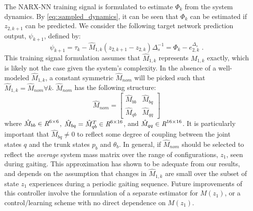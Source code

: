 			The  NARX-NN training signal is formulated to estimate $\Phi_{k}$ from the system dynamics. By \ref{eq::sampled_dynamics}, it can be seen that $\Phi_{k}$ can be estimated if ${z}_{2,k+1}$ can be predicted. We consider the following target network prediction output, $\psi_{k+1}$,  defined by:
				\begin{equation}
					\psi_{k+1} = \tau_{k} - \hat{M}_{1,k}({z}_{2,k+1} - {z}_{2,k})\Delta_{s}^{-1} = \Phi_{k} - {e}_{2,k}^{\Delta_{s}} \text{ .}
					\label{eq::training_signal}
				\end{equation}
			This training signal formulation assumes that $\hat{M}_{1,k}$ represents $M_{1,k}$ exactly, which is likely not the case given the system's complexity. In the absence of a well-modeled $\hat{M}_{1,k}$, a constant symmetric $\hat{M}_{nom}$ will be picked such that $\hat{M}_{1,k} = \hat{M}_{nom} \forall k$. $\hat{M}_{nom}$ has the following structure:
				\begin{equation}
					\hat{M}_{nom} = \left[
						\begin{array}{cc}
						\hat{M}_{bb}	&	 \hat{M}_{bq}\\
						\hat{M}_{qb}	&	 \hat{M}_{qq}
						\end{array}
					\right]
				\end{equation}
			where 	$\hat{M}_{bb}\in \emph{R}^{6\times6}$, 
					$\hat{M}_{bq}=\hat{M}_{qb}^{T} \in \emph{R}^{6\times16}$, and  
					$\hat{M}_{qq}\in \emph{R}^{16\times16}$. 
			It is particularly important that $\hat{M}_{bq}\neq0$ to reflect some degree of coupling between the joint states $q$ and the trunk states ${p}_{b}$ and $\theta_{b}$. In general, if $\hat{M}_{nom}$ should be selected to reflect the \emph{average} system mass matrix over the range of configurations, $z_{1}$, seen during gaiting. This approximation has shown to be adequate from our results, and depends on the assumption that changes in $\hat{M}_{1,k}$ are small  over the subset of state $z_{1}$ experiences during a periodic gaiting sequence. Future improvements of this controller involve the formulation of a separate estimator for $M(z_{1})$, or a control/learning scheme with no direct dependence on $M(z_{1})$.

